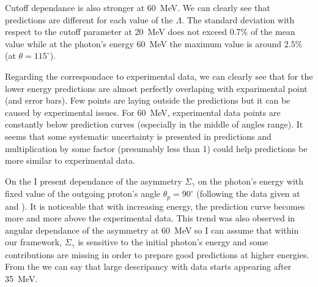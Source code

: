     Cutoff dependance is also stronger at 60~MeV. We can clearly see
    that predictions are different for each value of the $\Lambda$.
    The standard deviation with respect to the cutoff parameter at 20~MeV
    does not exceed 0.7\% of the mean value while at the photon's energy 60~MeV
     the maximum value is around 2.5\% (at $\theta = 115^\circ$).

     Regarding the correspondace to experimental data, we can clearly see that
     for the lower energy predictions are almost perfectly overlaping
     with exparimental point (and error bars). Few points are laying
     outside the predictions but it can be caused by experimental issues.
     For 60~MeV, experimental data points are constantly below prediction
     curves (especially in the middle of angles range). It seems that some systematic 
     uncertainty is presented in predictions and multiplication by some factor
     (presumably less than 1)
     could help predictions be more similar to experimental data.

     On the  I present dependance of the asymmetry
     $\Sigma_\gamma$ on the photon's energy with fixed value
     of the outgoing proton's angle $\theta_p = 90^\circ$ 
     (following the data given at \cite{delbianco_1981} and \cite{depascale_asymmetry}).
     It is noticeable that with increasing energy, the prediction curve
     becomes more and more above the experimental data. This trend
     was also observed in angular dependance of the asymmetry at 60~MeV
     so I can assume that within our framework, 
     $\Sigma_\gamma$ is sensitive to the initial photon's energy and some 
     contributions are missing in order to prepare good predictions
     at higher energies. From the  we can say that
     large descripancy with data starts appearing after 
     35~MeV. 


